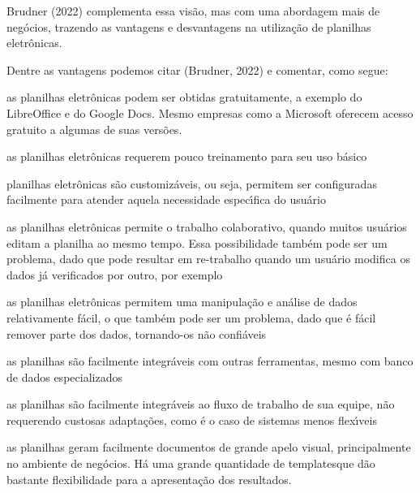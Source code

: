 \documentclass[
12pt,		%
openright,	%
twoside,  %
a4paper,			%
chapter=TITLE,		%
english,			%
french,				%
spanish,			%
brazil				%
]{USPSC-classe/USPSC}
\begin{document}
 Brudner (2022) complementa essa vis\~ao, mas com uma abordagem mais de neg\'ocios, trazendo as vantagens e desvantagens na utiliza\c{c}\~ao de planilhas eletr\^onicas.










Dentre as vantagens podemos citar (Brudner, 2022) e comentar, como segue:











\begin{alineas}
\item as planilhas eletr\^onicas podem ser obtidas gratuitamente, a exemplo do LibreOffice e do Google Docs. Mesmo empresas como a Microsoft oferecem acesso gratuito a algumas de suas vers\~oes.
\item as planilhas eletr\^onicas requerem pouco treinamento para seu uso b\'asico
\item planilhas eletr\^onicas s\~ao \textquotedbl customiz\'aveis\textquotedbl , ou seja, permitem ser configuradas facilmente para atender aquela necessidade espec\'{\i}fica do usu\'ario
\item as planilhas eletr\^onicas permite o trabalho colaborativo, quando muitos usu\'arios editam a planilha ao mesmo tempo. Essa possibilidade tamb\'em pode ser um problema, dado que pode resultar em re-trabalho quando um usu\'ario modifica os dados j\'a verificados por outro, por exemplo
\item as planilhas eletr\^onicas permitem uma manipula\c{c}\~ao e an\'alise de dados relativamente f\'acil, o que tamb\'em pode ser um problema, dado que \'e f\'acil remover parte dos dados, tornando-os n\~ao confi\'aveis
\item as planilhas s\~ao facilmente integr\'aveis com outras  ferramentas, mesmo com banco de dados especializados
\item as planilhas s\~ao facilmente integr\'aveis ao fluxo de trabalho de sua equipe, n\~ao requerendo custosas adapta\c{c}\~oes, como \'e o caso de sistemas menos flex\'{\i}veis
\item as planilhas geram facilmente documentos de grande apelo visual, principalmente no ambiente de neg\'ocios. H\'a uma grande quantidade de \textquotedbl templates\textquotedbl  que d\~ao bastante flexibilidade para a apresenta\c{c}\~ao dos resultados.
\end{alineas}
\end{document}
